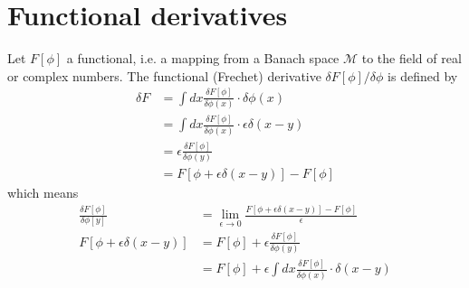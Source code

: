\documentclass[../main.tex]{subfiles}
\begin{document}
\section{Functional derivatives}
Let $F[\phi]$ a functional, i.e. a mapping from a Banach space $\mathcal{M}$ to the field of real or complex numbers. The functional (Frechet) derivative $\delta F[\phi]/\delta\phi$ is defined by
\begin{align}
    \delta F
    &=\int dx \frac{\delta F[\phi]}{\delta\phi(x)}\cdot\delta\phi(x)\\
    &=\int dx \frac{\delta F[\phi]}{\delta\phi(x)}\cdot\epsilon\delta(x-y)\\
    &=\epsilon\frac{\delta F[\phi]}{\delta\phi(y)}\\
    &=F[\phi+\epsilon\delta(x-y)]-F[\phi]
\end{align}
which means
\begin{align}
    \frac{\delta F[\phi]}{\delta\phi[y]}&=\lim_{\epsilon\rightarrow0}\frac{F[\phi+\epsilon\delta(x-y)]-F[\phi]}{\epsilon}\\
    F[\phi+\epsilon\delta(x-y)]&=F[\phi]+\epsilon\frac{\delta F[\phi]}{\delta\phi(y)}\\
    &=F[\phi]+\epsilon\int dx \frac{\delta F[\phi]}{\delta\phi(x)}\cdot\delta(x-y)
\end{align}
\end{document}

